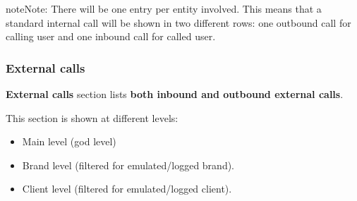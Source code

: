\documentclass[letterpaper,10pt,english]{sphinxmanual}
\begin{document}
\begin{notice}{note}{Note:}
There will be one entry per entity involved. This means that a standard internal call will be shown
in two different rows: one outbound call for calling user and one inbound call for called user.
\end{notice}


\subsubsection{External calls}
\label{administration_portal/client/vpbx/calls/external_calls::doc}\label{administration_portal/client/vpbx/calls/external_calls:external-calls}
\textbf{External calls} section lists \textbf{both inbound and outbound external calls}.

This section is shown at different levels:
\begin{itemize}
\item {} 
Main level (god level)

\item {} 
Brand level (filtered for emulated/logged brand).

\item {} 
Client level (filtered for emulated/logged client).

\end{itemize}
\end{document}
